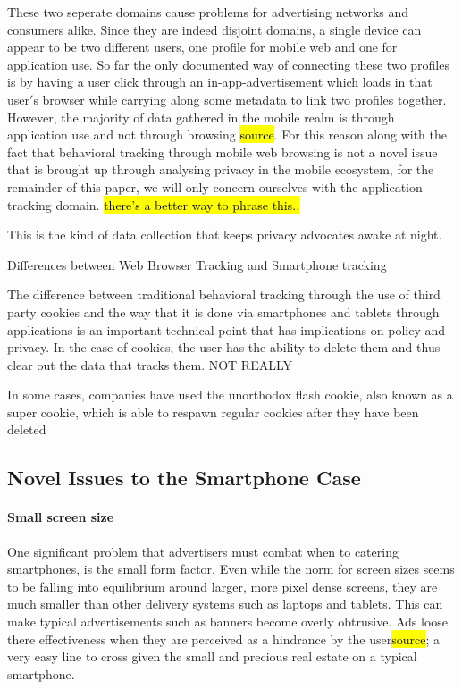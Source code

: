 
These two seperate domains cause problems for advertising networks and consumers alike. Since they are indeed disjoint domains, a single device can appear to be two different users, one profile for mobile web and one for application use. So far the only documented way of connecting these two profiles is by having a user click through an in-app-advertisement which loads in that user$'$s browser while carrying along some metadata to link two profiles together\cite{Trust2013b}. 
However, the majority of data gathered in the mobile realm is through application use and not through browsing \hl{source}. For this reason along with the fact that behavioral tracking through mobile web browsing is not a novel issue that is brought up through analysing privacy in the mobile ecosystem, for the remainder of this paper, we will only concern ourselves with the application tracking domain. \hl{there's a better way to phrase this..} 

This is the kind of data collection that keeps privacy advocates awake at night. 

Differences between Web Browser Tracking and Smartphone tracking

The difference between traditional behavioral tracking through the use of third party cookies and the way that it is done via smartphones and tablets through applications is an important technical point that has implications on policy and privacy. In the case of cookies, the user has the ability to delete them and thus clear out the data that tracks them. NOT REALLY

In some cases, companies have used the unorthodox flash cookie, also known as a super cookie, which is able to respawn regular cookies after they have been deleted


	\subsection{Novel Issues to the Smartphone Case}

		\paragraph{Small screen size} %
One significant problem that advertisers must combat when to catering smartphones, is the small form factor. 
Even while the norm for screen sizes seems to be falling into equilibrium around larger, more pixel dense screens, they are much smaller than other delivery systems such as laptops and tablets. This can make typical advertisements such as banners become overly obtrusive. Ads loose there effectiveness when they are perceived as a hindrance by the user\hl{source}; a very easy line to cross given the small and precious real estate on a typical smartphone. 

